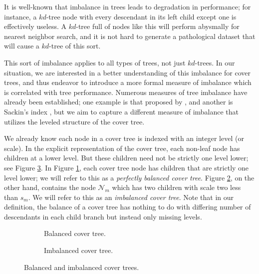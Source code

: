 It is well-known that imbalance in trees leads to degradation in performance;
for instance, a $kd$-tree node with every descendant in its left child except
one is effectively useless.  A $kd$-tree full of nodes like this will perform
abysmally for nearest neighbor search, and it is not hard to generate a
pathological dataset that will cause a $kd$-tree of this sort.

This sort of imbalance applies to all types of trees, not just $kd$-trees.  In
our situation, we are interested in a better understanding of this imbalance for
cover trees, and thus endeavor to introduce a more formal measure of imbalance
which is correlated with tree performance.  Numerous measures of tree
imbalance have already been established; one example is that proposed by
\citet{colless1982review}, and another is Sackin's index \citep{sackin1972good},
but we aim to capture a different measure of imbalance that utilizes the leveled
structure of the cover tree.

We already know each node in a cover tree is indexed with an integer level (or
scale).  In the explicit representation of the cover tree, each non-leaf node
has children at a lower level.  But these children need not be strictly one
level lower; see Figure \ref{fig:imbalance}.  In Figure
\ref{fig:imbalance-good}, each cover tree node has children that are strictly
one level lower; we will refer to this as a {\em perfectly balanced cover tree}.
Figure \ref{fig:imbalance-bad}, on the other hand, contains the node
$\mathscr{N}_m$ which has two children with scale two less than $s_m$.  We will
refer to this as an {\em imbalanced cover tree}.  Note that in our definition,
the balance of a cover tree has nothing to do with differing number of
descendants in each child branch but instead only missing levels.

\begin{figure}[b!]
\begin{subfigure}[b]{0.585\textwidth}
  \begin{center}
    
  \end{center}
  \caption{Balanced cover tree.}
  \label{fig:imbalance-good}
\end{subfigure}
\begin{subfigure}[b]{0.415\textwidth}
  \begin{center}
    
  \end{center}
  \caption{Imbalanced cover tree.}
  \label{fig:imbalance-bad}
\end{subfigure}
\caption{Balanced and imbalanced cover trees.}
\label{fig:imbalance}
\end{figure}

